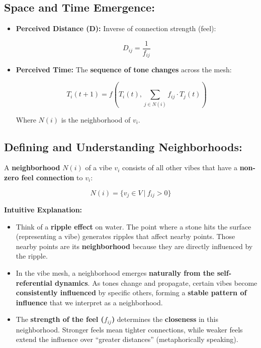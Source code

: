 \documentclass{article}
\begin{document}
\subsection{Space and Time Emergence:}

\begin{itemize}
\item \textbf{Perceived Distance (D):} Inverse of connection strength (feel):

\[
D_{ij} = \frac{1}{f_{ij}}
\]

\item \textbf{Perceived Time:} The \textbf{sequence of tone changes} across the mesh:

\[
T_i(t+1) = f\left(T_i(t), \sum_{j \in N(i)} f_{ij} \cdot T_j(t) \right)
\]

Where $N(i)$ is the neighborhood of $v_i$.
\end{itemize}

\subsection{Defining and Understanding Neighborhoods:}

A \textbf{neighborhood} $N(i)$ of a vibe $v_i$ consists of all other vibes that have a \textbf{non-zero feel connection} to $v_i$:

\[
N(i) = \{ v_j \in V \ | \ f_{ij} > 0 \}
\]

\textbf{Intuitive Explanation:}

\begin{itemize}
\item Think of a \textbf{ripple effect} on water. The point where a stone hits the surface (representing a vibe) generates ripples that affect nearby points. Those nearby points are its \textbf{neighborhood} because they are directly influenced by the ripple.
\item In the vibe mesh, a neighborhood emerges \textbf{naturally from the self-referential dynamics}. As tones change and propagate, certain vibes become \textbf{consistently influenced} by specific others, forming a \textbf{stable pattern of influence} that we interpret as a neighborhood.
\item The \textbf{strength of the feel ($f_{ij}$)} determines the \textbf{closeness} in this neighborhood. Stronger feels mean tighter connections, while weaker feels extend the influence over ``greater distances'' (metaphorically speaking).
\end{itemize}
\end{document}
